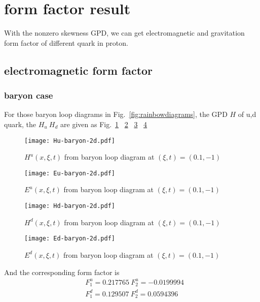\documentclass[preprintnumbers,prd,superscriptaddress,preprint]{revtex4-1}
\begin{document}
	\section{form factor result}
	With the nonzero skewness GPD,  we can get electromagnetic and gravitation form factor of different quark in proton. 
	\subsection{electromagnetic form factor}
	\subsubsection{baryon case}
	For those baryon loop diagrams in Fig.~\ref{fig:rainbowdiagrams}, the GPD $H$ of u,d quark, the $H_{u}\ H_{d}$ are given as Fig.~\ref{Hu-bar} ~\ref{Eu-bar}  ~\ref{Hd-bar} ~\ref{Ed-bar}  
	\begin{figure}[h]
		\begin{center}
			\texttt{[image: Hu-baryon-2d.pdf]}
			\caption{$H^{u}(x,\xi,t)$ from baryon loop diagram at $(\xi,t)=(0.1,-1)$} 
			\label{Hu-bar}
		\end{center}
	\end{figure}
	\begin{figure}[h]
		\begin{center}
			\texttt{[image: Eu-baryon-2d.pdf]}
			\caption{$E^{u}(x,\xi,t)$ from baryon loop diagram at $(\xi,t)=(0.1,-1)$} 
			\label{Eu-bar}
		\end{center}
	\end{figure}  
	\begin{figure}[h]
		\begin{center}
			\texttt{[image: Hd-baryon-2d.pdf]}
			\caption{$H^{d}(x,\xi,t)$ from baryon loop diagram at $(\xi,t)=(0.1,-1)$} 
			\label{Hd-bar}
		\end{center}
	\end{figure}
	\begin{figure}[h]
		\begin{center}
			\texttt{[image: Ed-baryon-2d.pdf]}
			\caption{$E^{d}(x,\xi,t)$ from baryon loop diagram at $(\xi,t)=(0.1,-1)$} 
			\label{Ed-bar}
		\end{center}
	\end{figure}  
	And the corresponding form factor is 
	\begin{align}
		& F^{u}_{1}=0.217765 \ F^{u}_{2}=-0.0199994 \\
		& F^{d}_{1}=0.129507 \ F^{d}_{2}=0.0594396
	\end{align}
\end{document}
